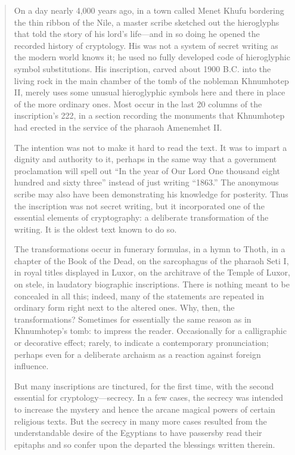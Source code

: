 \begin{quote}
On a day nearly 4,000 years ago, in a town called Menet Khufu bordering the thin ribbon of the Nile, a master scribe sketched out the hieroglyphs that told the story of his lord's life—and in so doing he opened the recorded history of cryptology. His was not a system of secret writing as the modern world knows it; he used no fully developed code of hieroglyphic symbol substitutions. His inscription, carved about 1900 B.C. into the living rock in the main chamber of the tomb of the nobleman Khnumhotep II, merely uses some unusual hieroglyphic symbols here and there in place of the more ordinary ones. Most occur in the last 20 columns of the inscription's 222, in a section recording the monuments that Khnumhotep had erected in the service of the pharaoh Amenemhet II.

The intention was not to make it hard to read the text. It was to impart a dignity and authority to it, perhaps in the same way that a government proclamation will spell out ``In the year of Our Lord One thousand eight hundred and sixty three'' instead of just writing ``1863.'' The anonymous scribe may also have been demonstrating his knowledge for posterity. Thus the inscription was not secret writing, but it incorporated one of the essential elements of cryptography: a deliberate transformation of the writing. It is the oldest text known to do so.

The transformations occur in funerary formulas, in a hymn to Thoth, in a chapter of the Book of the Dead, on the sarcophagus of the pharaoh Seti I, in royal titles displayed in Luxor, on the architrave of the Temple of Luxor, on stele, in laudatory biographic inscriptions. There is nothing meant to be concealed in all this; indeed, many of the statements are repeated in ordinary form right next to the altered ones. Why, then, the transformations? Sometimes for essentially the same reason as in Khnumhotep's tomb: to impress the reader. Occasionally for a calligraphic or decorative effect; rarely, to indicate a contemporary pronunciation; perhaps even for a deliberate archaism as a reaction against foreign influence.

But many inscriptions are tinctured, for the first time, with the second essential for cryptology—secrecy. In a few cases, the secrecy was intended to increase the mystery and hence the arcane magical powers of certain religious texts. But the secrecy in many more cases resulted from the understandable desire of the Egyptians to have passersby read their epitaphs and so confer upon the departed the blessings written therein.


\end{quote}
